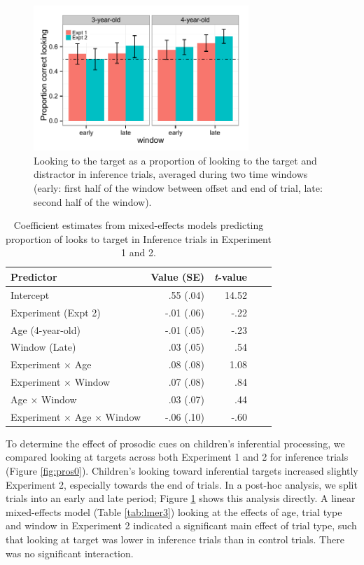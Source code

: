 \documentclass[10pt,letterpaper]{article}
\begin{document}
\begin{figure}[t]
\begin{center} 
\includegraphics[width=3.2in]{figures/expt12-accuracy_inf.pdf}
\caption{\label{fig:0prosbar} Looking to the target as a proportion of looking to the target and distractor in inference trials, averaged during two time windows (early: first half of the window between offset and end of trial, late: second half of the window).}
\end{center} 
\end{figure}

\begin{table}[b!]
\caption{\label{tab:lmer4}  Coefficient estimates from mixed-effects models predicting proportion of looks to target in Inference trials in Experiment 1 and 2.} 
\begin{center} 
\begin{tabular}{l r r r l} 
\hline
Predictor  &  Value (SE) & \emph{t}-value\\
\hline
Intercept  & .55 (.04) & 14.52 \\
Experiment (Expt 2)  & -.01 (.06) &  -.22 \\
Age (4-year-old) & -.01 (.05) &  -.23 \\
Window (Late) & .03 (.05) & .54 \\
Experiment $\times$  Age & .08 (.08) & 1.08 \\
Experiment $\times$  Window & .07 (.08) & .84 \\
Age $\times$  Window & .03 (.07) & .44 \\
Experiment $\times$ Age $\times$ Window & -.06 (.10) & -.60 \\
\hline
\end{tabular} 
\end{center} 
\end{table}

To determine the effect of prosodic cues on children's inferential processing, we compared looking at targets across both Experiment 1 and 2 for inference trials (Figure \ref{fig:pros0}). Children's looking toward inferential targets increased slightly Experiment 2, especially towards the end of trials. In a post-hoc analysis, we split trials into an early and late period; Figure \ref{fig:0prosbar} shows this analysis directly. A linear mixed-effects model (Table \ref{tab:lmer3}) looking at the effects of age, trial type and window in Experiment 2 indicated a significant main effect of trial type, such that looking at target was lower in inference trials than in control trials. There was no significant interaction.
\end{document}
